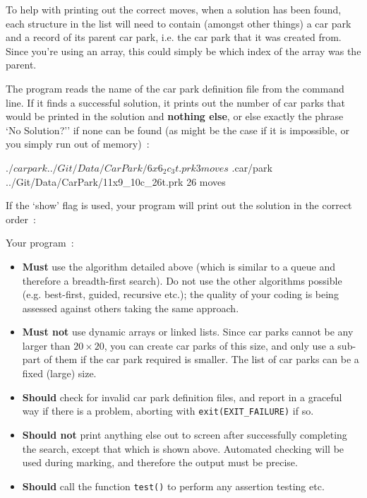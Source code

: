 \begin{exercise}
\noindent To help with printing out the correct moves, when a solution
has been found, each structure in the list will need to contain (amongst
other things) a car park and a record of its parent car park, i.e. the car park
that it was created from. Since you're using an array, this could simply
be which index of the array was the parent.

\noindent The program reads the name of the car park definition file from
the command line.  If it finds a successful solution, it prints out the
number of car parks that would be printed in the solution and {\bf nothing
else}, or else exactly the phrase `No Solution?'' if none can be found
(as might be the case if it is impossible, or you simply run out of memory)~:

\begin{terminaloutput}
$ ./carpark ../Git/Data/CarPark/6x6_2c_3t.prk
3 moves
$ .car/park ../Git/Data/CarPark/11x9_10c_26t.prk
26 moves
\end{terminaloutput}

If the `show' flag is used, your program will print out the solution in the correct order~:

\noindent
Your program~:
\begin{itemize}
\item {\bf Must} use the algorithm detailed above (which is similar to a queue and therefore a breadth-first search). Do not use the other algorithms possible (e.g. best-first, guided, recursive etc.); the quality of your coding is being assessed against others taking the same approach.
\item {\bf Must not} use dynamic arrays or linked lists. Since car parks cannot be any larger than $20 $, you can create car parks of this size, and only use a sub-part of them if the car park required is smaller. The list of car parks can be a fixed (large) size.
\item {\bf Should} check for invalid car park definition files, and report in a graceful way if there is a problem, aborting with \verb^exit(EXIT_FAILURE)^ if so.
\item {\bf Should not} print anything else out to screen after successfully
completing the search, except that which is shown above. Automated checking
will be used during marking, and therefore the output must be precise.
\item {\bf Should} call the function \verb^test()^ to perform any assertion testing etc.
\end{itemize}


\end{exercise}
